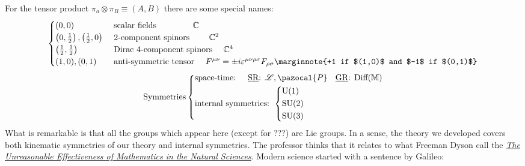 \documentclass[../main.tex]{subfiles}
\begin{document}
For the tensor product $\pi_a\otimes\pi_B\equiv(A,B)$ there are some special names:
\[
\begin{cases}
(0,0) &\text{ scalar fields \qquad\qquad $\mathbb{C}$}\\
\left(0,\frac{1}{2}\right),\left(\frac{1}{2},0\right) &\text{ 2-component spinors \quad\quad $\mathbb{C}^2$}\\
\left(\frac{1}{2},\frac{1}{2}\right)  &\text{ Dirac 4-component spinors \quad $\mathbb{C}^4$}\\
(1,0),(0,1) &\text{ anti-symmetric tensor \quad $F^{\mu\nu}=\pm i\varepsilon^{\mu\nu\rho\sigma}F_{\rho\sigma}$}\marginnote{+1 if $(1,0)$ and $-1$ if $(0,1)$}
\end{cases}
\]
\[
\text{Symmetries} 
\left\{
\begin{aligned}
&\text{space-time: \quad \underline{SR}: $\mathcal{L},\pazocal{P}$ \; \underline{GR}: Diff$(\mathbb{M})$}\\
&\text{internal symmetries: }
\left\{
\begin{aligned}
&\text{U}(1)\\
&\text{SU}(2)\\
&\text{SU}(3)
\end{aligned}
\right.
\end{aligned}
\right.
\]
What is remarkable is that all the groups which appear here (except for ???) are Lie groups. In a sense, the theory we developed covers both kinematic symmetries of our theory and internal symmetries. The professor thinks that it relates to what Freeman Dyson
call the \textit{\href{https://en.wikipedia.org/wiki/The_Unreasonable_Effectiveness_of_Mathematics_in_the_Natural_Sciences}{The Unreasonable Effectiveness of Mathematics in the Natural Sciences}}. Modern science started with a sentence by Galileo:
\end{document}
